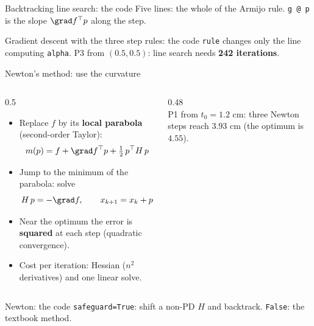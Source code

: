 \begin{frame}{Backtracking line search: the code}
  \vspace{6pt}
  \small Five lines: the whole of the Armijo rule. \texttt{g @ p} is the slope $\grad f^\top p$ along the step.
\end{frame}

\begin{frame}{Gradient descent with the three step rules: the code}
  \footnotesize \texttt{rule} changes only the line computing \texttt{alpha}. P3 from $(0.5,0.5)$: line search needs \textbf{242 iterations}.
\end{frame}

\begin{frame}{Newton's method: use the curvature}
  \begin{columns}[T]
    \begin{column}{0.5\textwidth}
      \begin{itemize}
        \item Replace $f$ by its \textbf{local parabola} (second-order Taylor):
        \[ m(p)=f+\grad f^\top p+\tfrac12\,p^\top H\,p \]
        \item Jump to the minimum of the parabola: solve
        \[ H\,p=-\grad f,\qquad x_{k+1}=x_k+p \]
        \item Near the optimum the error is \textbf{squared} at each step (quadratic convergence).
        \item Cost per iteration: Hessian ($n^2$ derivatives) and one linear solve.
      \end{itemize}
    \end{column}
    \begin{column}{0.48\textwidth}
      \\[-2pt]
      \scriptsize P1 from $t_0=1.2$ cm: three Newton steps reach $3.93$ cm (the optimum is $4.55$).
    \end{column}
  \end{columns}
\end{frame}

\begin{frame}{Newton: the code}
  \small \texttt{safeguard=True}: shift a non-PD $H$ and backtrack. \texttt{False}: the textbook method.
\end{frame}


